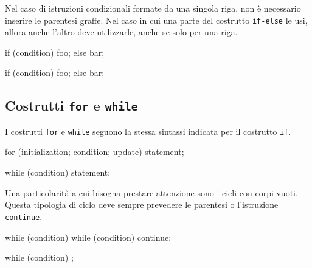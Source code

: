 Nel caso di istruzioni condizionali formate da una singola riga, non è necessario inserire le parentesi graffe.
Nel caso in cui una parte del costrutto \texttt{if-else} le usi, allora anche l'altro deve utilizzarle, anche se solo per una riga.

\noindent\begin{minipage}[t]{\cbwidth}
\begin{RightCode}
if (condition)
{
  foo;
}
else
{
  bar;
}
\end{RightCode}
\end{minipage}%
\hspace{\cbdistance}
\begin{minipage}[t]{\cbwidth}
\begin{ErrorCode}
if (condition)
{
  foo;
}
else
  bar;
\end{ErrorCode}
\end{minipage}

\subsection{Costrutti \texttt{for} e \texttt{while}}

I costrutti \texttt{for} e \texttt{while} seguono la stessa sintassi indicata per il costrutto \texttt{if}.

\noindent\begin{minipage}[t]{\rbwidth}
\begin{RightCode}
for (initialization; condition; update)
{
  statement;
}

while (condition)
{
  statement;
}
\end{RightCode}
\end{minipage}%

Una particolarità a cui bisogna prestare attenzione sono i cicli con corpi vuoti.
Questa tipologia di ciclo deve sempre prevedere le parentesi o l'istruzione \texttt{continue}.

\noindent\begin{minipage}[t]{\cbwidth}
\begin{RightCode}
while (condition) {}
while (condition) continue;
\end{RightCode}
\end{minipage}%
\hspace{\cbdistance}
\begin{minipage}[t]{\cbwidth}
\begin{ErrorCode}
while (condition) ;
\end{ErrorCode}
\end{minipage}

